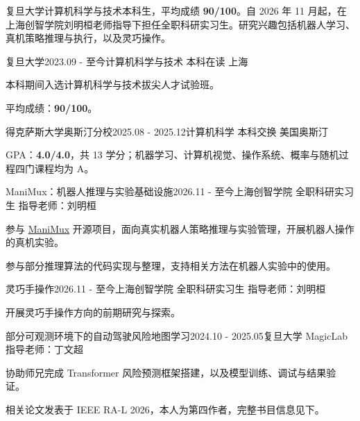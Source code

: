 \documentclass[10pt,a4paper]{article}
\begin{document}
复旦大学计算机科学与技术本科生，平均成绩 \textbf{90/100}。自 2026 年 11 月起，在上海创智学院刘明桓老师指导下担任全职科研实习生。研究兴趣包括机器人学习、真机策略推理与执行，以及灵巧操作。

\begin{cventry}{复旦大学}{2023.09 - 至今}{计算机科学与技术 本科在读 \textbar{} 上海}
\begin{cvitems}
\item 本科期间入选计算机科学与技术拔尖人才试验班。
\item 平均成绩：\textbf{90/100}。
\end{cvitems}
\end{cventry}

\begin{cventry}{得克萨斯大学奥斯汀分校}{2025.08 - 2025.12}{计算机科学 本科交换 \textbar{} 美国奥斯汀}
\begin{cvitems}
\item GPA：\textbf{4.0/4.0}，共 13 学分；机器学习、计算机视觉、操作系统、概率与随机过程四门课程均为 A。
\end{cvitems}
\end{cventry}

\begin{cventry}{ManiMux：机器人推理与实验基础设施}{2026.11 - 至今}{上海创智学院 \textbar{} 全职科研实习生 \textbar{} 指导老师：刘明桓}
\begin{cvitems}
\item 参与 \href{https://github.com/SII-LiuLab/manimux}{ManiMux} 开源项目，面向真实机器人策略推理与实验管理，开展机器人操作的真机实验。
\item 参与部分推理算法的代码实现与整理，支持相关方法在机器人实验中的使用。
\end{cvitems}
\end{cventry}

\begin{cventry}{灵巧手操作}{2026.11 - 至今}{上海创智学院 \textbar{} 全职科研实习生 \textbar{} 指导老师：刘明桓}
\begin{cvitems}
\item 开展灵巧手操作方向的前期研究与探索。
\end{cvitems}
\end{cventry}

\begin{cventry}{部分可观测环境下的自动驾驶风险地图学习}{2024.10 - 2025.05}{复旦大学 MagicLab \textbar{} 指导老师：丁文超}
\begin{cvitems}
\item 协助师兄完成 Transformer 风险预测框架搭建，以及模型训练、调试与结果验证。
\item 相关论文发表于 IEEE RA-L 2026，本人为第四作者，完整书目信息见下。
\end{cvitems}
\end{cventry}
\end{document}
